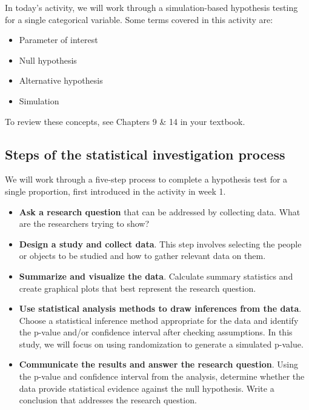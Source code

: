 \documentclass[
]{report}
\begin{document}
In today's activity, we will work through a simulation-based hypothesis testing for a single categorical variable. Some terms covered in this activity are:

\begin{itemize}
\item
  Parameter of interest
\item
  Null hypothesis
\item
  Alternative hypothesis
\item
  Simulation
\end{itemize}

To review these concepts, see Chapters 9 \& 14 in your textbook.

\subsection{Steps of the statistical investigation process}\label{steps-of-the-statistical-investigation-process-2}

We will work through a five-step process to complete a hypothesis test for a single proportion, first introduced in the activity in week 1.

\begin{itemize}
\item
  \textbf{Ask a research question} that can be addressed by collecting data. What are the researchers trying to show?
\item
  \textbf{Design a study and collect data}. This step involves selecting the people or objects to be studied and how to gather relevant data on them.
\item
  \textbf{Summarize and visualize the data}. Calculate summary statistics and create graphical plots that best represent the research question.
\item
  \textbf{Use statistical analysis methods to draw inferences from the data}. Choose a statistical inference method appropriate for the data and identify the p-value and/or confidence interval after checking assumptions. In this study, we will focus on using randomization to generate a simulated p-value.
\item
  \textbf{Communicate the results and answer the research question}. Using the p-value and confidence interval from the analysis, determine whether the data provide statistical evidence against the null hypothesis. Write a conclusion that addresses the research question.
\end{itemize}

\newpage
\end{document}
